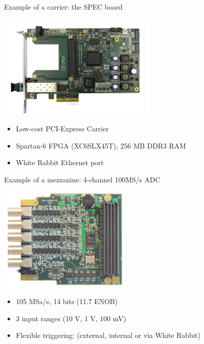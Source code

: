\documentclass[compress,red]{beamer}
\begin{document}
\begin{frame}{Example of a carrier: the SPEC board}
\begin{center}
\includegraphics[height=5cm]{node/spec_photo.jpg}
\begin{itemize}
\item Low-cost PCI-Express Carrier
\item Spartan-6 FPGA (XC6SLX45T), 256 MB DDR3 RAM
\item White Rabbit Ethernet port
\end{itemize}
\end{center}
\end{frame}

\begin{frame}{Example of a mezzanine: 4-channel 100MS/s ADC}
\begin{center}
\includegraphics[height=5cm]{node/adc.jpg}
\begin{itemize}
\item 105 MSa/s, 14 bits (11.7 ENOB)
\item 3 input ranges (10 V, 1 V, 100 mV)
\item Flexible triggering: (external, internal or via White Rabbit)
\end{itemize}
\end{center}
\end{frame}
\end{document}
